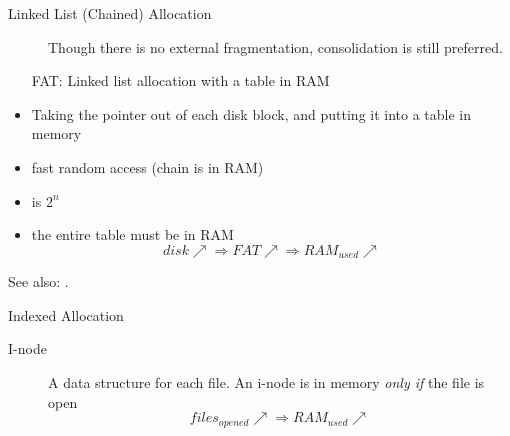 \begin{frame}
  \begin{description}
  \item[Linked List (Chained) Allocation] Though there is no external fragmentation,
    consolidation is still preferred.
  \end{description}
  \begin{center}
  \end{center}
\end{frame}

\begin{frame}
  \begin{itemize}
  \item[FAT:] Linked list allocation with a table in RAM
  \end{itemize}
  \begin{minipage}{.59\textwidth}
    \begin{block}{}
      \begin{itemize}
      \item Taking the pointer out of each disk block, and putting it into a table in
        memory
      \item fast random access (chain is in RAM)
      \item is $2^n$
      \item the entire table must be in RAM
        $$disk\nearrow{}\Rightarrow FAT\nearrow{}\Rightarrow RAM_{used}\nearrow$$
      \end{itemize}
    \end{block}
  \end{minipage}\quad
  \begin{minipage}{.35\textwidth}
  \end{minipage}
\end{frame}

See also: .

\begin{frame}
  \begin{description}
  \item[Indexed Allocation]
  \end{description}
  \begin{center}
  \end{center}
  \begin{description}
  \item[I-node] A data structure for each file. An i-node is in memory \emph{only if} the
    file is open
    $$files_{opened}\nearrow{}\Rightarrow{}RAM_{used}\nearrow{}$$
  \end{description}
\end{frame}

